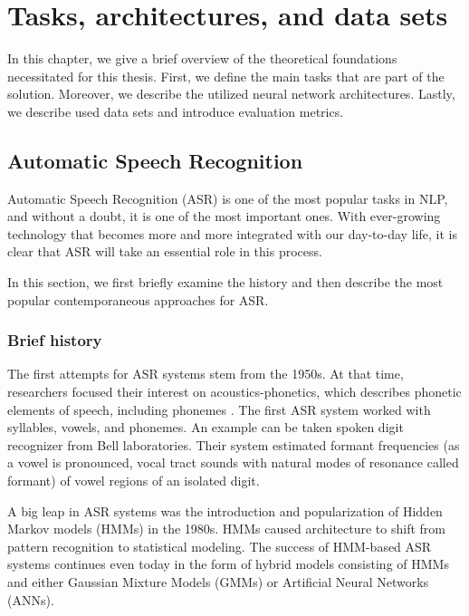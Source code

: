\chapter{Tasks, architectures, and data sets}
\label{chap:theory}

In this chapter, we give a brief overview of the theoretical foundations necessitated for this thesis. First, we define the main tasks that are part of the solution. Moreover, we describe the utilized neural network architectures. Lastly, we describe used data sets and introduce evaluation metrics.

\section{Automatic Speech Recognition}

Automatic Speech Recognition (ASR) is one of the most popular tasks in NLP, and without a doubt, it is one of the most important ones. With ever-growing technology that becomes more and more integrated with our day-to-day life, it is clear that ASR will take an essential role in this process.

In this section, we first briefly examine the history and then describe the most popular contemporaneous approaches for ASR.

\subsection{Brief history}

The first attempts for ASR systems stem from the 1950s. At that time, researchers focused their interest on acoustics-phonetics, which describes phonetic elements of speech, including phonemes . The first ASR system worked with syllables, vowels, and phonemes. An example can be taken spoken digit recognizer from Bell laboratories. Their system estimated formant frequencies (as a vowel is pronounced, vocal tract sounds with natural modes of resonance called formant) of vowel regions of an isolated digit. 

A big leap in ASR systems was the introduction and popularization of Hidden Markov models (HMMs) in the 1980s. HMMs caused architecture to shift from pattern recognition to statistical modeling. The success of HMM-based ASR systems continues even today in the form of hybrid models consisting of HMMs and either Gaussian Mixture Models (GMMs) or Artificial Neural Networks (ANNs).

